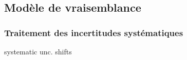 \subsection{Modèle de vraisemblance}\label{chapter-HTT_analysis-section-signal_extraction-likelihood}


\subsubsection{Traitement des incertitudes systématiques}\label{chapter-HTT_analysis-section-signal_extraction-likelihood-syst_uncs}


systematic unc. shifts~\cite{BarlowBeeston,BarlowBeeston2}
